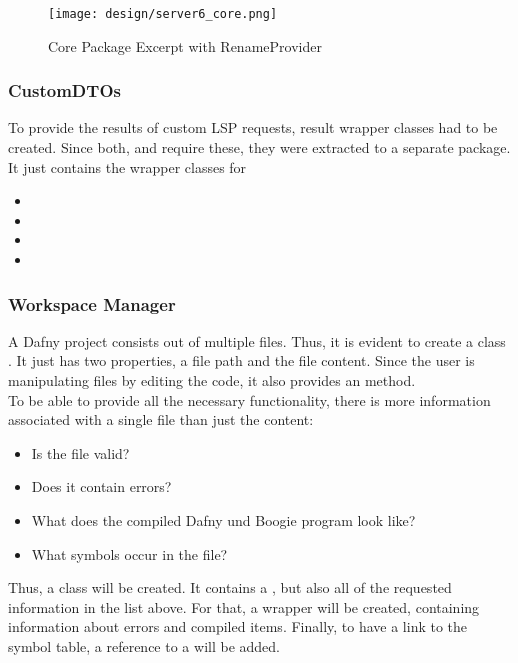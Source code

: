 
\begin{figure}[H]
    \centering
    \texttt{[image: design/server6\_core.png]}
    \caption{Core Package Excerpt with RenameProvider}
    \label{fig:server_core}
\end{figure}

\subsubsection{CustomDTOs}
To provide the results of custom LSP requests, result wrapper classes had to be created.
Since both,  and  require these, they were extracted to a separate package.
It just contains the wrapper classes for
\begin{itemize}
    \item {}
    \item {}
    \item {}
    \item {}
\end{itemize}

\subsubsection{Workspace Manager}
A Dafny project consists out of multiple  files.
Thus, it is evident to create a class .
It just has two properties, a file path and the file content.
Since the user is manipulating files by editing the code, it also provides an  method.\\

To be able to provide all the necessary functionality, there is more information associated with a single file than just the content:
\begin{itemize}
    \item Is the file valid?
    \item Does it contain errors?
    \item What does the compiled Dafny und Boogie program look like?
    \item What symbols occur in the file?
\end{itemize}

Thus, a class  will be created.
It contains a , but also all of the requested information in the list above.
For that, a wrapper  will be created, containing information about errors and compiled items.
Finally, to have a link to the symbol table, a reference to a  will be added.\\

